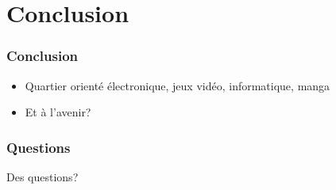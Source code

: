\documentclass{beamer}
\begin{document}
\section{Conclusion}

\begin{frame}
  \frametitle{Conclusion}
  \begin{itemize}
    \item Quartier orienté électronique, jeux vidéo, informatique, manga
    \item Et à l'avenir?
  \end{itemize}
\end{frame}

\begin{frame}
  \frametitle{Questions}
  \Large Des questions?
\end{frame}
\end{document}
